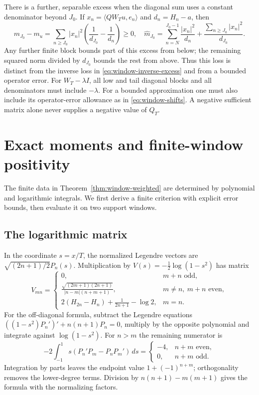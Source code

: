 \documentclass[11pt]{article}
\theoremstyle{definition}
\theoremstyle{remark}
\numberwithin{equation}{section}
\begin{document}
There is a further, separable excess when the diagonal sum uses a
constant denominator beyond $J_0$.  If
$x_n=\langle QW_Tu,e_n\rangle$ and $d_n=H_n-a$, then
\[
 \widehat m_{J_0}-m_u
   =\sum_{n\ge J_0}|x_n|^2
                \left(\frac1{d_{J_0}}-\frac1{d_n}\right)\ge0,
 \quad
 \widehat m_{J_0}=
  \sum_{n=N}^{J_0-1}\frac{|x_n|^2}{d_n}
       +\frac{\sum_{n\ge J_0}|x_n|^2}{d_{J_0}}.
\]
Any further finite block bounds part of this excess from below;
the remaining squared norm divided by $d_{J_0}$ bounds the rest
from above.  Thus this loss is distinct from the inverse loss in
\eqref{eq:window-inverse-excess} and from a bounded operator error.
For $W_T-\lambda I$, all low and tail diagonal blocks and all
denominators must include $-\lambda$.  For a bounded approximation
one must also include its operator-error allowance as in
\eqref{eq:window-shifts}.  A negative sufficient matrix alone
never supplies a negative value of $Q_T$.

\section{Exact moments and finite-window positivity}
\label{sec:window-finite}

The finite data in Theorem~\ref{thm:window-weighted} are determined
by polynomial and logarithmic integrals.  We first derive a finite
criterion with explicit error bounds, then evaluate it on two support
windows.

\subsection{The logarithmic matrix}

In the coordinate $s=x/T$, the normalized Legendre vectors are
$\sqrt{(2n+1)/2}P_n(s)$.  Multiplication by
$V(s)=-\tfrac12\log(1-s^2)$ has matrix
\begin{equation}
 V_{mn}=\begin{cases}
 0,&m+n\text{ odd},\\[2pt]
 \displaystyle\frac{\sqrt{(2m+1)(2n+1)}}{|n-m|(n+m+1)},
      &m\ne n,\ m+n\text{ even},\\[6pt]
 \displaystyle 2(H_{2n}-H_n)+\frac1{2n+1}-\log2,&m=n.
 \end{cases}
 \label{eq:window-log-matrix}
\end{equation}
For the off-diagonal formula, subtract the Legendre equations
$((1-s^2)P_n')'+n(n+1)P_n=0$, multiply by the opposite
polynomial and integrate against $\log(1-s^2)$.  For $n>m$ the
remaining numerator is
\[
 -2\int_{-1}^1s(P_n'P_m-P_nP_m')\,ds
   =\begin{cases}-4,&n+m\text{ even},\\0,&n+m\text{ odd}.
     \end{cases}
\]
Integration by parts leaves the endpoint value $1+(-1)^{n+m}$;
orthogonality removes the lower-degree terms.  Division by
$n(n+1)-m(m+1)$ gives the formula with the normalizing factors.
\end{document}

